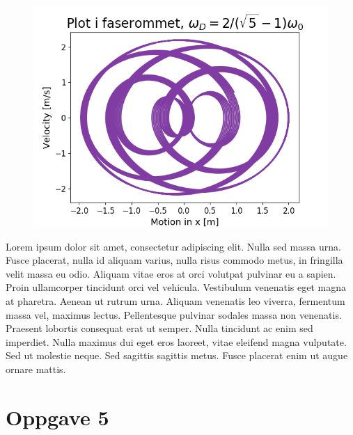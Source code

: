 \documentclass[norsk,a4paper,12pt]{article}
\begin{document}
\begin{figure}[H]
\includegraphics[scale=0.8]{Oppgave4del2.png}
\end{figure}


Lorem ipsum dolor sit amet, consectetur adipiscing elit. Nulla sed massa urna. Fusce placerat, nulla id aliquam varius, nulla risus commodo metus, in fringilla velit massa eu odio. Aliquam vitae eros at orci volutpat pulvinar eu a sapien. Proin ullamcorper tincidunt orci vel vehicula. Vestibulum venenatis eget magna at pharetra. Aenean ut rutrum urna. Aliquam venenatis leo viverra, fermentum massa vel, maximus lectus. Pellentesque pulvinar sodales massa non venenatis. Praesent lobortis consequat erat ut semper. Nulla tincidunt ac enim sed imperdiet. Nulla maximus dui eget eros laoreet, vitae eleifend magna vulputate. Sed ut molestie neque. Sed sagittis sagittis metus. Fusce placerat enim ut augue ornare mattis.
\\


\section*{Oppgave 5}
\end{document}
